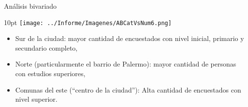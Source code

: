 \documentclass[pdf]{beamer}
\def\vspace{}%
\begin{document}
{\begin{frame}{Análisis bivariado}
    \begin{minipage}{0.55\textwidth}
        \vspace{10pt}
        \texttt{[image: ../Informe/Imagenes/ABCatVsNum6.png]}
    \end{minipage}
    \begin{minipage}{0.4\textwidth}
        \begin{itemize}
            \vspace{4pt}
            \justifying%
            \item Sur de la ciudad: mayor cantidad de encuestados con nivel inicial, primario y secundario completo,
            \item Norte (particularmente el barrio de Palermo): mayor cantidad de personas con estudios superiores,
            \item Comunas del este (``centro de la ciudad''): Alta cantidad de encuestados con nivel superior.
        \end{itemize}
    \end{minipage}

\end{frame}    

    



}
\end{document}

